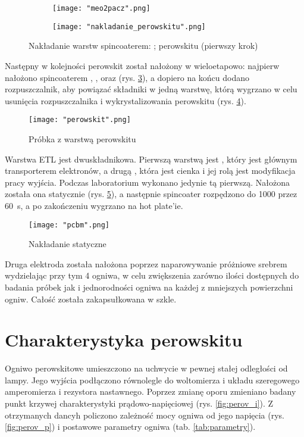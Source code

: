 \documentclass[a4, 12pt]{article}
\begin{document}
	\begin{figure}[H]
		\centering
		\begin{subfigure}{0.45\textwidth}
			\centering
			\texttt{[image: "meo2pacz".png]}
			\caption{\label{fig:nakladanie_meo2pacz}}
		\end{subfigure}
		\begin{subfigure}{0.45\textwidth}
			\centering
			\texttt{[image: "nakladanie\_perowskitu".png]}
			\caption{\label{fig:nakladanie_perowskitu}}
		\end{subfigure}
		\captionsetup{subrefformat=parens}
		\caption{Nakładanie warstw spincoaterem:  ;  perowskitu (pierwszy krok)}
	\end{figure}
	Następny w kolejności perowskit został nałożony w wieloetapowo: najpierw nałożono spincoaterem , ,  oraz  (rys. \ref{fig:nakladanie_perowskitu}), a dopiero na końcu dodano rozpuszczalnik, aby powiązać składniki w jedną warstwę, którą wygrzano w celu usunięcia rozpuszczalnika i wykrystalizowania perowskitu (rys. \ref{fig:perowskit}). 
	\begin{figure}[H]
		\centering
		\texttt{[image: "perowskit".png]}
		\caption{Próbka z warstwą perowskitu}
		\label{fig:perowskit}
	\end{figure}
	Warstwa ETL jest dwuskładnikowa. Pierwszą warstwą jest , który jest głównym transporterem elektronów, a drugą \textemdash {}, która jest cienka i jej rolą jest modyfikacja pracy wyjścia. Podczas laboratorium wykonano jedynie tą pierwszą. Nałożona została ona statycznie (rys. \ref{fig:pcbm}), a następnie spincoater rozpędzono do \qty{1000}{\rpm} przez \qty{60}{\s}, a po zakończeniu wygrzano na hot plate'ie. 
	
	\begin{figure}[H]
		\centering
		\texttt{[image: "pcbm".png]}
		\caption{Nakładanie statyczne }
		\label{fig:pcbm}
	\end{figure}
	
	Druga elektroda została nałożona poprzez naparowywanie próżniowe srebrem wydzielając przy tym 4 ogniwa, w celu zwiększenia zarówno ilości dostępnych do badania próbek jak i jednorodności ogniwa na każdej z mniejszych powierzchni ogniw. Całość została zakapsułkowana w szkle. 
	
	\section{Charakterystyka perowskitu}
	Ogniwo perowskitowe umieszczono na uchwycie w pewnej stałej odległości od lampy. Jego wyjścia podłączono równolegle do woltomierza i układu szeregowego amperomierza i rezystora nastawnego. Poprzez zmianę oporu zmieniano badany punkt krzywej charakterystyki prądowo-napięciowej (rys. \ref{fig:perov_i}). Z otrzymanych dancyh policzono zależność mocy ogniwa od jego napięcia (rys. \ref{fig:perov_p}) i postawowe parametry ogniwa (tab. \ref{tab:parametry}). 
	
\end{document}
